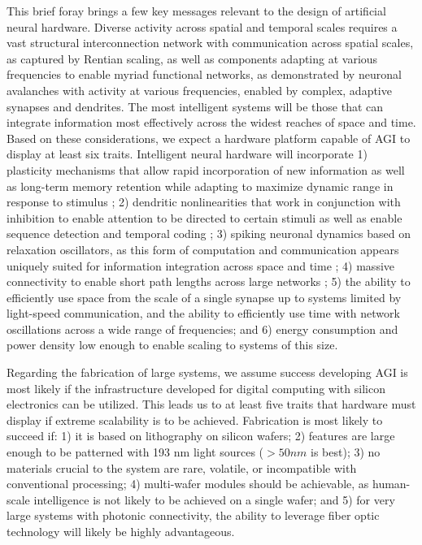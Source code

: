 \documentclass[twocolumn]{article}
\begin{document}
This brief foray brings a few key messages relevant to the design of artificial neural hardware. Diverse activity across spatial and temporal scales requires a vast structural interconnection network with communication across spatial scales, as captured by Rentian scaling, as well as components adapting at various frequencies to enable myriad functional networks, as demonstrated by neuronal avalanches with activity at various frequencies, enabled by complex, adaptive synapses and dendrites. The most intelligent systems will be those that can integrate information most effectively across the widest reaches of space and time. Based on these considerations, we expect a hardware platform capable of AGI to display at least six traits. Intelligent neural hardware will incorporate 1) plasticity mechanisms that allow rapid incorporation of new information as well as long-term memory retention \cite{fudr2005,fuab2007} while adapting to maximize dynamic range in response to stimulus \cite{shki2006}; 2) dendritic nonlinearities that work in conjunction with inhibition to enable attention to be directed to certain stimuli \cite{bu2006} as well as enable sequence detection \cite{haah2015} and temporal coding \cite{}; 3) spiking neuronal dynamics based on relaxation oscillators, as this form of computation and communication appears uniquely suited for information integration across space and time \cite{bu2006}; 4) massive connectivity to enable short path lengths across large networks \cite{sp2010}; 5) the ability to efficiently use space from the scale of a single synapse up to systems limited by light-speed communication, and the ability to efficiently use time with network oscillations across a wide range of frequencies; and 6) energy consumption and power density low enough to enable scaling to systems of this size.

Regarding the fabrication of large systems, we assume success developing AGI is most likely if the infrastructure developed for digital computing with silicon electronics can be utilized. This leads us to at least five traits that hardware must display if extreme scalability is to be achieved. Fabrication is most likely to succeed if: 1) it is based on lithography on silicon wafers; 2) features are large enough to be patterned with 193 nm light sources ($> 50 nm$ is best); 3) no materials crucial to the system are rare, volatile, or incompatible with conventional processing; 4) multi-wafer modules should be achievable, as human-scale intelligence is not likely to be achieved on a single wafer; and 5) for very large systems with photonic connectivity, the ability to leverage fiber optic technology will likely be highly advantageous.
\end{document}
